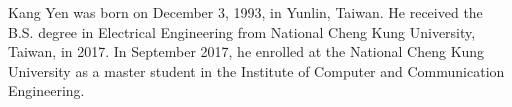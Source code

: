 \documentclass[12pt]{ksthesis}
\begin{document}
\singlespace {\large



}



\doublespace

\begin{vita}
\Thesisspace \large{

Kang Yen was born on December 3, 1993, in Yunlin, Taiwan.  He received the B.S. degree in Electrical Engineering from National Cheng Kung University, Taiwan, in 2017. In September 2017, he enrolled at the National Cheng Kung University as a master student in the Institute of Computer and Communication Engineering.

}\end{vita}
\end{document}
